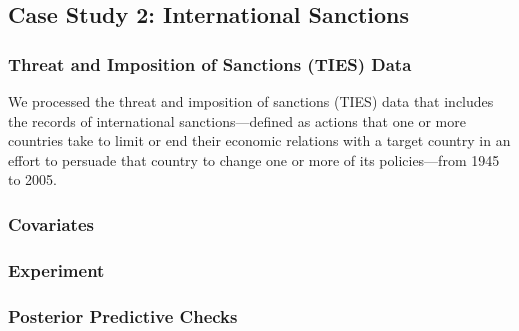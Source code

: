 \documentclass[12pt]{article}
\begin{document}
\subsection{Case Study 2: International Sanctions}\label{subsec:International Sanctions}
\subsubsection{Threat and Imposition of Sanctions (TIES) Data}\label{subsubsec:TIES}
We processed the threat and imposition of sanctions (TIES) data \citep{morgan2014threat} that includes the records of international sanctions---defined as actions that one or more countries take to limit or end their economic relations with a target country in an effort to persuade that country to change one or more of its policies---from 1945 to 2005.
\subsubsection{Covariates}\label{subsec:Covariates_sanction}
\subsubsection{Experiment}\label{subsec:Experiment_sanction}
\subsubsection{Posterior Predictive Checks}\label{subsubsec:PPC_sanction} 	   
\end{document}
